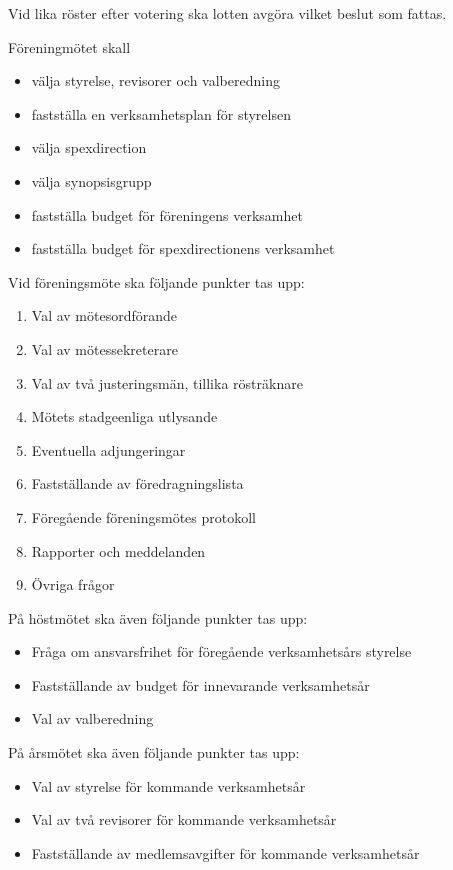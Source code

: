 \documentclass[a4paper]{article}
\begin{document}
Vid lika röster efter votering ska lotten avgöra vilket beslut som fattas.\newline

\noindent
\newline
Föreningmötet skall
\begin{itemize}
  \item välja styrelse, revisorer och valberedning
  \item fastställa en verksamhetsplan för styrelsen
  \item välja spexdirection
  \item välja synopsisgrupp
  \item fastställa budget för föreningens verksamhet
  \item fastställa budget för spexdirectionens verksamhet
\end{itemize}

\noindent
\newline
Vid föreningsmöte ska följande punkter tas upp:
\begin{enumerate}
  \item Val av mötesordförande
  \item Val av mötessekreterare
  \item Val av två justeringsmän, tillika rösträknare
  \item Mötets stadgeenliga utlysande
  \item Eventuella adjungeringar
  \item Fastställande av föredragningslista
  \item Föregående föreningsmötes protokoll
  \item Rapporter och meddelanden
  \item Övriga frågor
\end{enumerate}

\noindent
\newline
På höstmötet ska även följande punkter tas upp:
\begin{itemize}
  \item Fråga om ansvarsfrihet för föregående verksamhetsårs styrelse
  \item Fastställande av budget för innevarande verksamhetsår
  \item Val av valberedning
\end{itemize}

\noindent
\newline
På årsmötet ska även följande punkter tas upp:
\begin{itemize}
  \item Val av styrelse för kommande verksamhetsår
  \item Val av två revisorer för kommande verksamhetsår
  \item Fastställande av medlemsavgifter för kommande verksamhetsår
\end{itemize}
\end{document}
